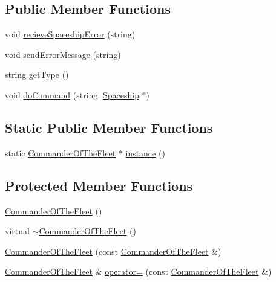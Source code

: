 \subsection*{Public Member Functions}
\begin{DoxyCompactItemize}
\item 
void \hyperlink{classCommanderOfTheFleet_a13e91b9342df067b375f7ef2b929c0d5}{recieve\+Spaceship\+Error} (string)
\item 
void \hyperlink{classCommanderOfTheFleet_a39cfd5c0016355543515e919791d7984}{send\+Error\+Message} (string)
\item 
string \hyperlink{classCommanderOfTheFleet_a6e025eb090e0e231ffa72e5e6a9f7ce0}{get\+Type} ()
\item 
void \hyperlink{classCommanderOfTheFleet_a083604612b705c159fdd16dff0d2d396}{do\+Command} (string, \hyperlink{classSpaceship}{Spaceship} $\ast$)
\end{DoxyCompactItemize}
\subsection*{Static Public Member Functions}
\begin{DoxyCompactItemize}
\item 
static \hyperlink{classCommanderOfTheFleet}{Commander\+Of\+The\+Fleet} $\ast$ \hyperlink{classCommanderOfTheFleet_a19e2583c1a60a01f5530b0f97fbcbca5}{instance} ()
\end{DoxyCompactItemize}
\subsection*{Protected Member Functions}
\begin{DoxyCompactItemize}
\item 
\hyperlink{classCommanderOfTheFleet_a8b61f0fbb16d5e8cbeda75d931b271c6}{Commander\+Of\+The\+Fleet} ()
\item 
virtual \hyperlink{classCommanderOfTheFleet_a63fcb504fd7d5dc035814bc137875cd2}{$\sim$\+Commander\+Of\+The\+Fleet} ()
\item 
\hyperlink{classCommanderOfTheFleet_a83cb8584c7f588f533bc33ed0168188b}{Commander\+Of\+The\+Fleet} (const \hyperlink{classCommanderOfTheFleet}{Commander\+Of\+The\+Fleet} \&)
\item 
\hyperlink{classCommanderOfTheFleet}{Commander\+Of\+The\+Fleet} \& \hyperlink{classCommanderOfTheFleet_aaa476181b99052293306fcfe57dfd642}{operator=} (const \hyperlink{classCommanderOfTheFleet}{Commander\+Of\+The\+Fleet} \&)
\end{DoxyCompactItemize}
